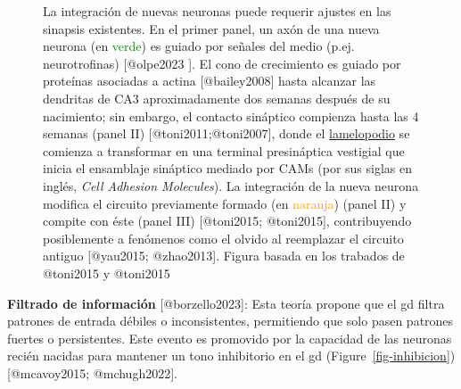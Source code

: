 \documentclass[
  11pt]{../MastersDoctoralThesisUNAM}
\begin{document}
\begin{tcolorbox}[enhanced jigsaw, colframe=quarto-callout-warning-color-frame, left=2mm, bottomrule=.15mm, rightrule=.15mm, arc=.35mm, toprule=.15mm, leftrule=.75mm, breakable, opacityback=0, colback=white]
\begin{figure}[H]
\begin{minipage}{0.50\linewidth}
\begin{figure}[H]
\end{figure}%

\end{minipage}%
%
\begin{minipage}{0.50\linewidth}
La integración de nuevas neuronas puede requerir ajustes en las sinapsis
existentes. En el primer panel, un axón de una nueva neurona (en
\textcolor{green}{verde}) es guiado por señales del medio (p.ej.
neurotrofinas) {[}@olpe2023 {]}. El cono de crecimiento es guiado por
proteínas asociadas a actina {[}@bailey2008{]} hasta alcanzar las
dendritas de CA3 aproximadamente dos semanas después de su nacimiento;
sin embargo, el contacto sináptico compienza hasta las 4 semanas (panel
II) {[}@toni2011;@toni2007{]}, donde el
\href{AppendixB.qmd\#term-id-52}{lamelopodio} se comienza a transformar
en una terminal presináptica vestigial que inicia el ensamblaje
sináptico mediado por CAMs (por sus siglas en inglés, \emph{Cell
Adhesion Molecules}). La integración de la nueva neurona modifica el
circuito previamente formado (en \textcolor{orange}{naranja}) (panel II)
y compite con éste (panel III) {[}@toni2015; @toni2015{]}, contribuyendo
posiblemente a fenómenos como el olvido al reemplazar el circuito
antiguo {[}@yau2015; @zhao2013{]}. Figura basada en los trabados de
@toni2015 y @toni2015\end{minipage}%

\end{figure}%

\textbf{Filtrado de información} {[}@borzello2023{]}: Esta teoría
propone que el \ac{gd} filtra patrones de entrada débiles o
inconsistentes, permitiendo que solo pasen patrones fuertes o
persistentes. Este evento es promovido por la capacidad de las neuronas
recién nacidas para mantener un tono inhibitorio en el \ac{gd}
(Figure~\ref{fig-inhibicion}) {[}@mcavoy2015; @mchugh2022{]}.


\end{tcolorbox}
\end{document}
